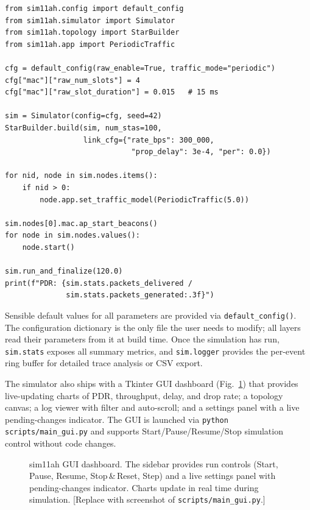 \documentclass[conference]{IEEEtran}
\begin{document}
\begin{lstlisting}[style=python, caption={Minimal sim11ah experiment.},
                   label={lst:workflow}]
from sim11ah.config import default_config
from sim11ah.simulator import Simulator
from sim11ah.topology import StarBuilder
from sim11ah.app import PeriodicTraffic

cfg = default_config(raw_enable=True, traffic_mode="periodic")
cfg["mac"]["raw_num_slots"] = 4
cfg["mac"]["raw_slot_duration"] = 0.015   # 15 ms

sim = Simulator(config=cfg, seed=42)
StarBuilder.build(sim, num_stas=100,
                  link_cfg={"rate_bps": 300_000,
                             "prop_delay": 3e-4, "per": 0.0})

for nid, node in sim.nodes.items():
    if nid > 0:
        node.app.set_traffic_model(PeriodicTraffic(5.0))

sim.nodes[0].mac.ap_start_beacons()
for node in sim.nodes.values():
    node.start()

sim.run_and_finalize(120.0)
print(f"PDR: {sim.stats.packets_delivered /
              sim.stats.packets_generated:.3f}")
\end{lstlisting}

Sensible default values for all parameters are provided via
\texttt{default\_config()}.
The configuration dictionary is the only file the user needs to modify; all
layers read their parameters from it at build time.
Once the simulation has run, \texttt{sim.stats} exposes all summary metrics,
and \texttt{sim.logger} provides the per-event ring buffer for detailed
trace analysis or CSV export.

The simulator also ships with a Tkinter GUI dashboard (Fig.~\ref{fig:gui})
that provides live-updating charts of PDR, throughput, delay, and drop rate;
a topology canvas; a log viewer with filter and auto-scroll; and a settings
panel with a live pending-changes indicator.
The GUI is launched via \texttt{python scripts/main\_gui.py} and supports
Start/Pause/Resume/Stop simulation control without code changes.

\begin{figure}[!t]
\centering
\fbox{\rule{0pt}{3.5cm}\rule{\columnwidth-2pt}{0pt}}
\caption{sim11ah GUI dashboard. The sidebar provides run controls (Start,
  Pause, Resume, Stop\,\&\,Reset, Step) and a live settings panel with
  pending-changes indicator. Charts update in real time during simulation.
  [Replace with screenshot of \texttt{scripts/main\_gui.py}.]}
\label{fig:gui}
\end{figure}
\end{document}

